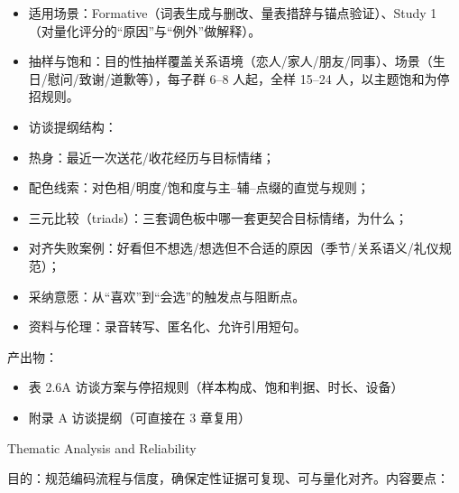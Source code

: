 \begin{itemize}

  \item 适用场景：Formative（词表生成与删改、量表措辞与锚点验证）、Study 1（对量化评分的“原因”与“例外”做解释）。

  \item 抽样与饱和：目的性抽样覆盖关系语境（恋人/家人/朋友/同事）、场景（生日/慰问/致谢/道歉等），每子群 6–8 人起，全样 15–24 人，以主题饱和为停招规则。

  \item 访谈提纲结构：

  \item 热身：最近一次送花/收花经历与目标情绪；

  \item 配色线索：对色相/明度/饱和度与主–辅–点缀的直觉与规则；

  \item 三元比较（triads）：三套调色板中哪一套更契合目标情绪，为什么；

  \item 对齐失败案例：好看但不想选/想选但不合适的原因（季节/关系语义/礼仪规范）；

  \item 采纳意愿：从“喜欢”到“会选”的触发点与阻断点。

  \item 资料与伦理：录音转写、匿名化、允许引用短句。

\end{itemize}

产出物：

\begin{itemize}

  \item 表 2.6A 访谈方案与停招规则（样本构成、饱和判据、时长、设备）

  \item 附录 A 访谈提纲（可直接在 3 章复用）

\end{itemize}

Thematic Analysis and Reliability

目的：规范编码流程与信度，确保定性证据可复现、可与量化对齐。内容要点：

